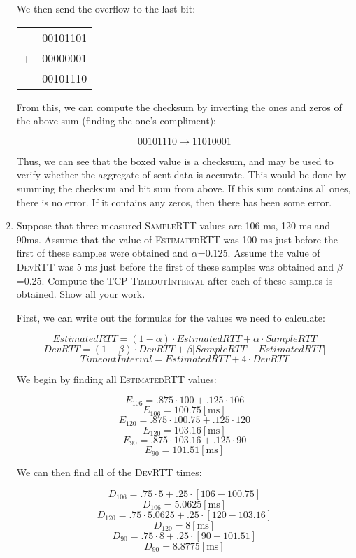 \begin{enumerate}
  We then send the overflow to the last bit:

  \begin{center}
    \begin{tabular}[h]{c c}
      & 00101101\\
      + & 00000001\\
      \hline
      & 00101110
    \end{tabular}
  \end{center}

  From this, we can compute the checksum by inverting the ones and zeros of the above sum (finding the one's compliment):

  $$00101110\to\boxed{11010001}$$

  Thus, we can see that the boxed value is a checksum, and may be used to verify whether the aggregate of sent data is accurate. This would be done by summing the checksum and bit sum from above. If this sum contains all ones, there is no error. If it contains any zeros, then there has been some error.

  \item Suppose that three measured \textsc{SampleRTT} values are 106 ms, 120 ms and 90ms.  Assume that the value of \textsc{EstimatedRTT} was 100 ms just before the first of these samples were obtained and $\alpha$=0.125. Assume the value of \textsc{DevRTT} was 5 ms just before the first of these samples was obtained and $\beta$=0.25. Compute the TCP \textsc{TimeoutInterval} after each of these samples is obtained. Show all your work.

    First, we can write out the formulas for the values we need to calculate:

    $$EstimatedRTT=(1-\alpha)\cdot EstimatedRTT + \alpha\cdot SampleRTT$$
    $$DevRTT=(1-\beta)\cdot DevRTT+\beta|SampleRTT-EstimatedRTT|$$
    $$TimeoutInterval=EstimatedRTT+4\cdot DevRTT$$

    We begin by finding all \textsc{EstimatedRTT} values:

    $$E_{106}=.875\cdot 100+.125\cdot 106$$
    $$\boxed{E_{106}=100.75[\si{\milli\second}]}$$
    $$E_{120}=.875\cdot 100.75+.125\cdot 120$$
    $$\boxed{E_{120}=103.16[\si{\milli\second}]}$$
    $$E_{90}=.875\cdot 103.16+.125\cdot 90$$
    $$\boxed{E_{90}=101.51[\si{\milli\second}]}$$

    We can then find all of the \textsc{DevRTT} times:

    $$D_{106}=.75\cdot 5+.25\cdot \left[ 106-100.75 \right]$$
    $$\boxed{D_{106}=5.0625[\si{\milli\second}]}$$
    $$D_{120}=.75\cdot 5.0625+.25\cdot \left[ 120-103.16 \right]$$
    $$\boxed{D_{120}=8[\si{\milli\second}]}$$
    $$D_{90}=.75\cdot 8+.25\cdot\left[ 90- 101.51\right]$$
    $$\boxed{D_{90}=8.8775[\si{\milli\second}]}$$


\end{enumerate}
